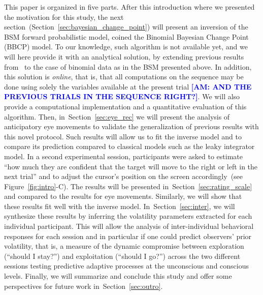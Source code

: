 \documentclass[12pt,english]{article}%
\newcommand{\citet}[1]{\textcite{#1}}
\newcommand{\seeFig}[1]{Figure~\ref{fig:#1}}
\newcommand{\seeSec}[1]{Section~\ref{sec:#1}}
\newcommand{\AM}[1]{\textbf{\textcolor{blue}{[AM: #1]}}}
\begin{document}
This paper is organized in five parts.
After this introduction where we presented the motivation for this study,
the next section~(\seeSec{bayesian_change_point}) will present
an inversion of the BSM forward probabilistic model,
coined the Binomial Bayesian Change Point (BBCP) model.
To our knowledge, such algorithm is not available yet, and
we will here provide it with an analytical solution,
by extending previous results from~\citet{AdamsMackay2007}
to the case of binomial data as in the BSM presented above.
In addition, this solution is \emph{online},
that is, that all computations on the sequence may be done 
using solely the variables available at the present trial \AM{AND THE PREVIOUS TRIALS IN THE SEQUENCE RIGHT?}.
We will also provide a computational implementation
and a quantitative evaluation of this algorithm.
Then, in~\seeSec{eye_rec} we will present  the analysis of anticipatory eye movements
to validate the generalization of previous results %
with this novel protocol. %
Such results will allow us to fit the inverse model and to compare
its prediction compared to classical models such as the leaky integrator model.
In a second experimental session, participants were asked to estimate
``how much they are confident that
the target will move to the right or left in the next trial'' and
to adjust the cursor's position on the screen accordingly~(see \seeFig{intro}-C).
The results will be presented in~\seeSec{rating_scale}
and compared to the results for eye movements.
Similarly, we will show that these results fit well
with the inverse model. 
In~\seeSec{inter}, we will synthesize these results 
by inferring the volatility parameters extracted
for each individual participant. %
This will allow the analysis of inter-individual behavioral responses for each session
and in particular if one could predict observers' prior volatility,
that is, a measure of the dynamic compromise between exploration (``should I stay?'')
and exploitation (``should I go?'')
across the two different sessions testing predictive adaptive processes
at the unconscious and conscious levels.
Finally, we will summarize and conclude this study and
offer some perspectives for future work in~\seeSec{outro}.
\end{document}
